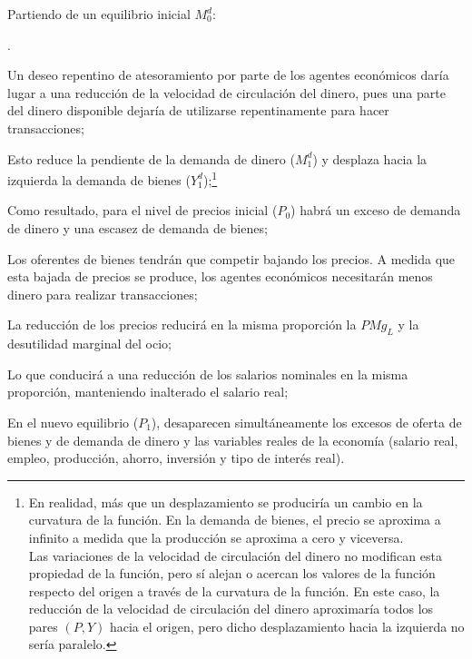 \documentclass[10pt,a4paper]{article}
\newcounter{numitem}
\newenvironment{lnum}
      {\begin{list}{\arabic{numitem}.}{%
          \usecounter{numitem}%
          \setlength{\leftmargin}{1cm}%
          \setlength{\parskip}{3pt}%
          \setlength{\itemsep}{0pt}%
          \setlength{\parsep}{0pt}%
      }}
      {\end{list}}
\begin{document}
Partiendo de un equilibrio inicial $M_0^d$:
\begin{lnum}
    \item Un deseo repentino de atesoramiento por parte de los agentes económicos daría lugar a una reducción de la velocidad de circulación del dinero, pues una parte del dinero disponible dejaría de utilizarse repentinamente para hacer transacciones; 
    \item Esto reduce la pendiente de la demanda de dinero ($M_1^d$) y desplaza hacia la izquierda la demanda de bienes ($Y_1^d$);\footnote{%
        En realidad, más que un desplazamiento se produciría un cambio en la curvatura de la función. En la demanda de bienes, el precio se aproxima a infinito a medida que la producción se aproxima a cero y viceversa.\\
    Las variaciones de la velocidad de circulación del dinero no modifican esta propiedad de la función, pero sí alejan o acercan los valores de la función respecto del origen a través de la curvatura de la función. En este caso, la reducción de la velocidad de circulación del dinero aproximaría todos los pares $(P,Y)$ hacia el origen, pero dicho desplazamiento hacia la izquierda no sería paralelo.
    } 
    \item Como resultado, para el nivel de precios inicial ($P_0$) habrá un exceso de demanda de dinero y una escasez de demanda de bienes;
    \item Los oferentes de bienes tendrán que competir bajando los precios. A medida que esta bajada de precios se produce, los agentes económicos necesitarán menos dinero para realizar transacciones;
    \item La reducción de los precios reducirá en la misma proporción la $PMg_L$ y la desutilidad marginal del ocio;
    \item Lo que conducirá a una reducción de los salarios nominales en la misma proporción, manteniendo inalterado el salario real; 
    \item En el nuevo equilibrio ($P_1$), desaparecen simultáneamente los excesos de oferta de bienes y de demanda de dinero y las variables reales de la economía (salario real, empleo, producción, ahorro, inversión y tipo de interés real).
\end{lnum}
\end{document}

